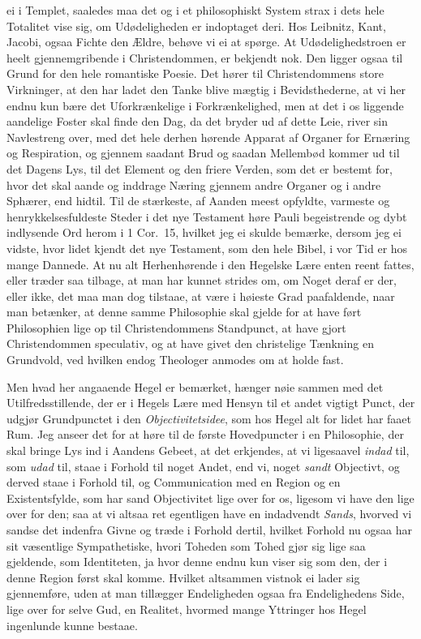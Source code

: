 \documentclass[12pt,a4paper]{book}
\newcommand{\apage}[1]{\marginnote{\footnotesize\textit{[#1]}}}
\begin{document}
ei i Templet, saaledes maa det og i et philosophiskt System strax i dets
hele Totalitet vise sig, om Udødeligheden er indoptaget deri. Hos Leibnitz,
Kant, Jacobi, ogsaa Fichte den Ældre, behøve vi ei at spørge. At
Udødelighedstroen er heelt gjennemgribende i Christendommen, er bekjendt
nok. Den ligger ogsaa til Grund for den hele romantiske Poesie. Det hører
til Christendommens store Virkninger, at den har ladet den Tanke blive
mægtig i Bevidsthederne, at vi her endnu kun bære det Uforkrænkelige i
Forkrænkelighed, men at det i os liggende aandelige Foster skal finde den
Dag, da det bryder ud af dette Leie, river sin Navlestreng over, med det
hele derhen hørende Apparat af Organer for Ernæring og Respiration, og
gjennem saadant Brud og saadan Mellembød kommer ud til det Dagens Lys, til
det Element og den friere Verden, som det \apage{14} er bestemt for, hvor det skal
aande og inddrage Næring gjennem andre Organer og i andre Sphærer, end
hidtil. Til de stærkeste, af Aanden meest opfyldte, varmeste og
henrykkelsesfuldeste Steder i det nye Testament høre Pauli begeistrende og
dybt indlysende Ord herom i 1 Cor.\ 15, hvilket jeg ei skulde bemærke,
dersom jeg ei vidste, hvor lidet kjendt det nye Testament, som den hele
Bibel, i vor Tid er hos mange Dannede. At nu alt Herhenhørende i den
Hegelske Lære enten reent fattes, eller træder saa tilbage, at man har
kunnet strides om, om Noget deraf er der, eller ikke, det maa man dog
tilstaae, at være i høieste Grad paafaldende, naar man betænker, at denne
samme Philosophie skal gjelde for at have ført Philosophien lige op til
Christendommens Standpunct, at have gjort Christendommen speculativ, og at
have givet den christelige Tænkning en Grundvold, ved hvilken endog
Theologer anmodes om at holde fast.

Men hvad her angaaende Hegel er bemærket, hænger nøie sammen med det
Utilfredsstillende, der er i Hegels Lære med Hensyn til et andet vigtigt
Punct, der udgjør Grundpunctet i den \emph{Objectivitetsidee}, som hos Hegel alt
for lidet har faaet Rum. Jeg anseer det for at høre til de første
Hovedpuncter i en Philosophie, der skal bringe Lys ind i Aandens Gebeet, at
det erkjendes, at vi ligesaavel \emph{indad} til, som \emph{udad} til, staae i Forhold
til noget Andet, end vi, noget \emph{sandt} Objectivt, og derved staae i Forhold
til, og Communication med en Region og en Existentsfylde, som har sand
Objectivitet lige over for os, ligesom vi have den lige over for den; saa
at vi altsaa ret egentligen have en indadvendt \emph{Sands}, hvorved vi sandse det
indenfra Givne og træde i Forhold dertil, hvilket Forhold nu ogsaa har sit
væsentlige Sympathetiske, hvori Toheden som Tohed gjør sig lige saa
gjeldende, som Identiteten, ja hvor denne endnu kun viser sig som den, der
i denne Region først skal komme. Hvilket altsammen vistnok ei lader sig
gjennemføre, uden at man tillægger Endeligheden \apage{15} ogsaa fra Endelighedens
Side, lige over for selve Gud, en Realitet, hvormed mange Yttringer hos
Hegel ingenlunde kunne bestaae.
\end{document}
